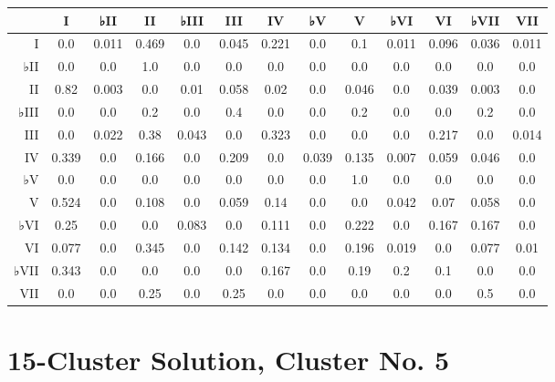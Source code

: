 \begin{table}[htbp]
\begin{minipage}{\linewidth}
\setlength{\tymax}{0.5\linewidth}
\centering
\small
\begin{tabulary}{\textwidth}{@{}RCCCCCCCCCCCC@{}} \toprule
&I&♭II&II&♭III&III&IV&♭V&V&♭VI&VI&♭VII&VII\\
\midrule
I&0.0&0.011&0.469&0.0&0.045&0.221&0.0&0.1&0.011&0.096&0.036&0.011\\
♭II&0.0&0.0&1.0&0.0&0.0&0.0&0.0&0.0&0.0&0.0&0.0&0.0\\
II&0.82&0.003&0.0&0.01&0.058&0.02&0.0&0.046&0.0&0.039&0.003&0.0\\
♭III&0.0&0.0&0.2&0.0&0.4&0.0&0.0&0.2&0.0&0.0&0.2&0.0\\
III&0.0&0.022&0.38&0.043&0.0&0.323&0.0&0.0&0.0&0.217&0.0&0.014\\
IV&0.339&0.0&0.166&0.0&0.209&0.0&0.039&0.135&0.007&0.059&0.046&0.0\\
♭V&0.0&0.0&0.0&0.0&0.0&0.0&0.0&1.0&0.0&0.0&0.0&0.0\\
V&0.524&0.0&0.108&0.0&0.059&0.14&0.0&0.0&0.042&0.07&0.058&0.0\\
♭VI&0.25&0.0&0.0&0.083&0.0&0.111&0.0&0.222&0.0&0.167&0.167&0.0\\
VI&0.077&0.0&0.345&0.0&0.142&0.134&0.0&0.196&0.019&0.0&0.077&0.01\\
♭VII&0.343&0.0&0.0&0.0&0.0&0.167&0.0&0.19&0.2&0.1&0.0&0.0\\
VII&0.0&0.0&0.25&0.0&0.25&0.0&0.0&0.0&0.0&0.0&0.5&0.0\\

\bottomrule

\end{tabulary}
\end{minipage}
\end{table}

\section{15-Cluster Solution, Cluster No. 5}
\label{15-clustersolutionclusterno.5}

